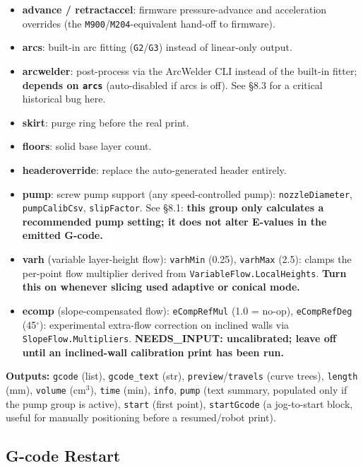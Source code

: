 \documentclass[11pt]{article}
\newcommand{\param}[1]{\texttt{#1}}
\newcommand{\iamdeg}{$^{\circ}$}
\begin{document}
\begin{itemize}
  \item \textbf{advance / retractaccel}: firmware pressure-advance and acceleration overrides (the \texttt{M900}/\texttt{M204}-equivalent hand-off to firmware).
  \item \textbf{arcs}: built-in arc fitting (\texttt{G2}/\texttt{G3}) instead of linear-only output.
  \item \textbf{arcwelder}: post-process via the ArcWelder CLI instead of the built-in fitter; \textbf{depends on \param{arcs}} (auto-disabled if arcs is off). See \S 8.3 for a critical historical bug here.
  \item \textbf{skirt}: purge ring before the real print.
  \item \textbf{floors}: solid base layer count.
  \item \textbf{headeroverride}: replace the auto-generated header entirely.
  \item \textbf{pump}: screw pump support (any speed-controlled pump): \param{nozzleDiameter}, \param{pumpCalibCsv}, \param{slipFactor}. See \S 8.1: \textbf{this group only calculates a recommended pump setting; it does not alter E-values in the emitted G-code.}
  \item \textbf{varh} (variable layer-height flow): \param{varhMin} (0.25), \param{varhMax} (2.5): clamps the per-point flow multiplier derived from \param{VariableFlow.LocalHeights}. \textbf{Turn this on whenever slicing used adaptive or conical mode.}
  \item \textbf{ecomp} (slope-compensated flow): \param{eCompRefMul} (1.0 = no-op), \param{eCompRefDeg} (45\iamdeg): experimental extra-flow correction on inclined walls via \param{SlopeFlow.Multipliers}. \textbf{NEEDS\_INPUT: uncalibrated; leave off until an inclined-wall calibration print has been run.}
\end{itemize}

\textbf{Outputs:} \param{gcode} (list), \param{gcode\_text} (str),
\param{preview}/\param{travels} (curve trees), \param{length} (mm),
\param{volume} (cm$^3$), \param{time} (min), \param{info}, \param{pump}
(text summary, populated only if the pump group is active),
\param{start} (first point), \param{startGcode} (a jog-to-start block,
useful for manually positioning before a resumed/robot print).

\subsection{G-code Restart}
\end{document}
